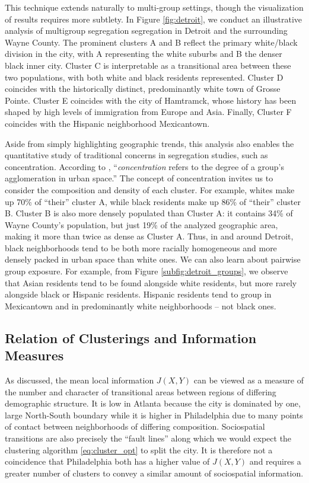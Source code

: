 \documentclass[english]{scrartcl}
\begin{document}
		This technique extends naturally to multi-group settings, though the visualization of results requires more subtlety. In Figure \ref{fig:detroit}, we conduct an illustrative analysis of multigroup segregation segregation in Detroit and the surrounding Wayne County. The prominent clusters A and B reflect the primary white/black division in the city, with A representing the white suburbs and B the denser black inner city. Cluster C is interpretable as a transitional area between these two populations, with both white and black residents represented. Cluster D coincides with the historically distinct, predominantly white town of Grosse Pointe. Cluster E coincides with the city of Hamtramck, whose history has been shaped by high levels of immigration from Europe and Asia. Finally, Cluster F coincides with the Hispanic neighborhood Mexicantown. 

		Aside from simply highlighting geographic trends, this analysis also enables the quantitative study of traditional concerns in segregation studies, such as concentration. According to \cite{Massey1988}, ``\emph{concentration} refers to the degree of a group's agglomeration in urban space.'' The concept of concentration invites us to consider the composition and density of each cluster. For example, whites make up 70\% of ``their'' cluster A, while black residents make up 86\% of ``their'' cluster B. Cluster B is also more densely populated than Cluster A: it contains 34\% of Wayne County's population, but just 19\% of the analyzed geographic area, making it more than twice as dense as Cluster A. Thus, in and around Detroit, black neighborhoods tend to be both more racially homogeneous and more densely packed in urban space than white ones. We can also learn about pairwise group exposure. For example, from Figure  \ref{subfig:detroit_groups}, we observe that Asian residents tend to be found alongside white residents, but more rarely alongside black or Hispanic residents. Hispanic residents tend to group in Mexicantown and in predominantly white neighborhoods -- not black ones.

	\subsection{Relation of Clusterings and Information Measures}

		As discussed, the mean local information $J(X,Y)$ can be viewed as a measure of the number and character of transitional areas between regions of differing demographic structure.  It is low in Atlanta because the city is dominated by one, large North-South boundary while it is higher in Philadelphia due to many points of contact between neighborhoods of differing composition. Sociospatial transitions are also precisely the ``fault lines'' along which we would expect the clustering algorithm \eqref{eq:cluster_opt} to split the city. It is therefore not a coincidence that Philadelphia both has a higher value of $J(X,Y)$ and requires a greater number of clusters to convey a similar amount of sociospatial information. 
\end{document}
